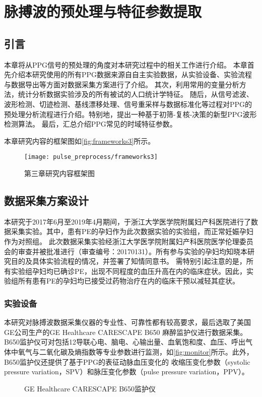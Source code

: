 \chapter{脉搏波的预处理与特征参数提取}
\section{引言}
本章将从PPG信号的预处理的角度对本研究过程中的相关工作进行介绍。
本章首先介绍本研究使用的所有PPG数据来源自自主实验数据，从实验设备、实验流程与数据导出等方面对数据采集方案进行了介绍。
其次，利用常用的变量分析方法，统计分析数据实验涉及的所有被试的人口统计学特征。
随后，从信号滤波、波形检测、切迹检测、基线漂移处理、信号重采样与数据标准化等过程对PPG的预处理分析流程进行介绍。特别地，提出一种基于初筛-复核-决策的新型PPG波形检测算法。
最后，汇总介绍PPG常见的时域特征参数。

本章研究内容的框架图如\autoref{fig:frameworks3}所示。

\begin{figure}[htbp]
    \centering
    \texttt{[image: pulse\_preprocess/frameworks3]}
    \caption{\label{fig:frameworks3}第三章研究内容框架图}
\end{figure}
\section{数据采集方案设计}
本研究于2017年6月至2019年4月期间，于浙江大学医学院附属妇产科医院进行了数据采集实验。其中，患有PE的孕妇作为此次数据实验的实验组，而正常妊娠孕妇作为对照组。
此次数据采集实验经浙江大学医学院附属妇产科医院医学伦理委员会的审查并被批准进行（审查编号：20170131）。所有参与实验的孕妇均知晓本研究目的及具体实验流程的情况，并签署了知情同意书。
需特别引起注意的是，所有实验组孕妇均已确诊PE，出现不同程度的血压升高在内的临床症状。因此，实验组所有患有PE的孕妇均已接受过药物治疗在内的临床干预以减轻其症状。
\subsection{实验设备}
本研究对脉搏波数据采集仪器的专业性、可靠性都有较高要求，最后选取了美国GE公司生产的GE Healthcare CARESCAPE B650 麻醉监护仪进行数据采集。
B650监护仪可对包括12导联心电、脑电、心输出量、血氧饱和度、血压、呼出气体中氧气与二氧化碳及熵指数等专业参数进行监测，如\autoref{fig:monitor}所示。此外，B650监护仪还提供了基于PPG的表征动脉血压变化的
收缩压变化参数（systolic pressure variation，SPV）和脉压变化参数（pulse pressure variation，PPV）\cite{GE2021,Michard1999}。
\begin{figure}[htbp]
    \centering
    \quad
    \caption{\label{fig:monitor}GE Healthcare CARESCAPE B650监护仪}
\end{figure}

